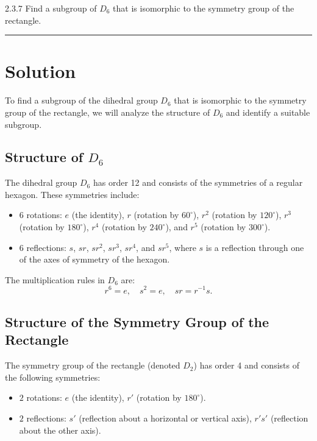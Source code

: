 \documentclass[12pt]{amsart}
\theoremstyle{definition}
\numberwithin{equation}{section}
\begin{document}
    
\begin{exercise}{2.3.7} 
    Find a subgroup of \(D_6\) that is isomorphic to the symmetry group of the rectangle.
    
    \noindent\rule{\linewidth}{1pt}
    
    \section*{Solution}
    
    To find a subgroup of the dihedral group \(D_6\) that is isomorphic to the symmetry group of the rectangle, we will analyze the structure of \(D_6\) and identify a suitable subgroup.
    
    \subsection*{Structure of \(D_6\)}
    
    The dihedral group \(D_6\) has order 12 and consists of the symmetries of a regular hexagon. These symmetries include:
    \begin{itemize}
        \item \(6\) rotations: \(e\) (the identity), \(r\) (rotation by \(60^\circ\)), \(r^2\) (rotation by \(120^\circ\)), \(r^3\) (rotation by \(180^\circ\)), \(r^4\) (rotation by \(240^\circ\)), and \(r^5\) (rotation by \(300^\circ\)).
        \item \(6\) reflections: \(s\), \(sr\), \(sr^2\), \(sr^3\), \(sr^4\), and \(sr^5\), where \(s\) is a reflection through one of the axes of symmetry of the hexagon.
    \end{itemize}
    
    The multiplication rules in \(D_6\) are:
    \[
    r^6 = e, \quad s^2 = e, \quad sr = r^{-1}s.
    \]
    
    \subsection*{Structure of the Symmetry Group of the Rectangle}
    
    The symmetry group of the rectangle (denoted \(D_2\)) has order 4 and consists of the following symmetries:
    \begin{itemize}
        \item \(2\) rotations: \(e\) (the identity), \(r'\) (rotation by \(180^\circ\)).
        \item \(2\) reflections: \(s'\) (reflection about a horizontal or vertical axis), \(r's'\) (reflection about the other axis).
    \end{itemize}
    

\end{exercise}
\end{document}
